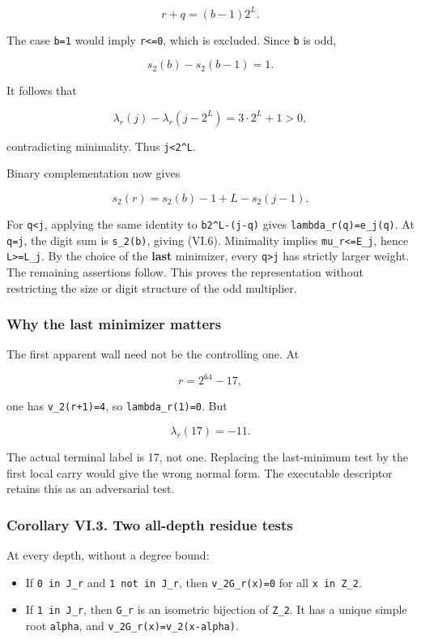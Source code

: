\documentclass[11pt,letterpaper]{article}
\providecommand{\tightlist}{\setlength{\itemsep}{0pt}\setlength{\parskip}{0pt}}
\begin{document}
\[
r+q=(b-1)2^L.
\]

The case \texttt{b=1} would imply \texttt{r\textless{}=0}, which is excluded. Since \texttt{b} is odd,

\[
s_2(b)-s_2(b-1)=1.
\]

It follows that

\[
\lambda_r(j)-\lambda_r(j-2^L)=3\cdot2^L+1>0,
\]

contradicting minimality. Thus \texttt{j\textless{}2\^{}L}.

Binary complementation now gives

\[
s_2(r)=s_2(b)-1+L-s_2(j-1).
\]

For \texttt{q\textless{}j}, applying the same identity to \texttt{b2\^{}L-(j-q)} gives \texttt{lambda\_r(q)=e\_j(q)}. At \texttt{q=j}, the digit sum is \texttt{s\_2(b)}, giving (VI.6). Minimality implies \texttt{mu\_r\textless{}=E\_j}, hence \texttt{L\textgreater{}=L\_j}. By the choice of the \textbf{last} minimizer, every \texttt{q\textgreater{}j} has strictly larger weight. The remaining assertions follow. This proves the representation without restricting the size or digit structure of the odd multiplier.

\subsubsection{Why the last minimizer matters}\label{why-the-last-minimizer-matters}

The first apparent wall need not be the controlling one. At

\[
r=2^{64}-17,
\]

one has \texttt{v\_2(r+1)=4}, so \texttt{lambda\_r(1)=0}. But

\[
\lambda_r(17)=-11.
\]

The actual terminal label is 17, not one. Replacing the last-minimum test by the first local carry would give the wrong normal form. The executable descriptor retains this as an adversarial test.

\subsubsection{Corollary VI.3. Two all-depth residue tests}\label{corollary-vi.3.-two-all-depth-residue-tests}

At every depth, without a degree bound:

\begin{itemize}
\tightlist
\item
  If \texttt{0\ in\ J\_r} and \texttt{1\ not\ in\ J\_r}, then \texttt{v\_2G\_r(x)=0} for all \texttt{x\ in\ Z\_2}.
\item
  If \texttt{1\ in\ J\_r}, then \texttt{G\_r} is an isometric bijection of \texttt{Z\_2}. It has a unique simple root \texttt{alpha}, and \texttt{v\_2G\_r(x)=v\_2(x-alpha)}.
\end{itemize}
\end{document}

